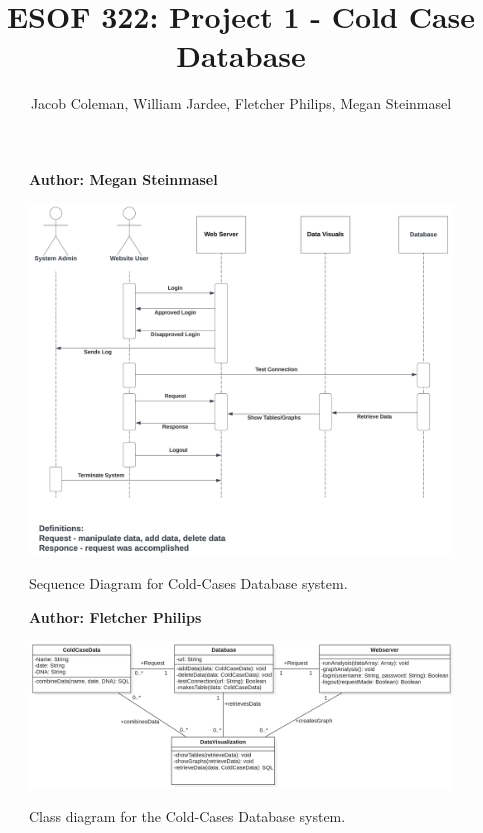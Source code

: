 \documentclass[11pt]{article}
\begin{document}
\title{ESOF 322: Project 1 - Cold Case Database}
\author{Jacob Coleman, William Jardee, Fletcher Philips, Megan Steinmasel}
\maketitle


\begin{figure}[!ht]
\centering
\textbf{Author: Megan Steinmasel}
\vspace{1em}

	\includegraphics[width=.85\textwidth]{./project2-Diagrams/ccsequence.png}\\
	\caption{Sequence Diagram for Cold-Cases Database system.}
	\label{fig:ccSequence}
\end{figure}

\begin{figure}[!ht]
\centering
\textbf{Author: Fletcher Philips}
\vspace{1em}

	\includegraphics[width=.95\textwidth]{./project2-Diagrams/project2ClassDiagram.png}\\
	\caption{Class diagram for the Cold-Cases Database system.}
	\label{fig:classDiagram}
\end{figure}
\end{document}

